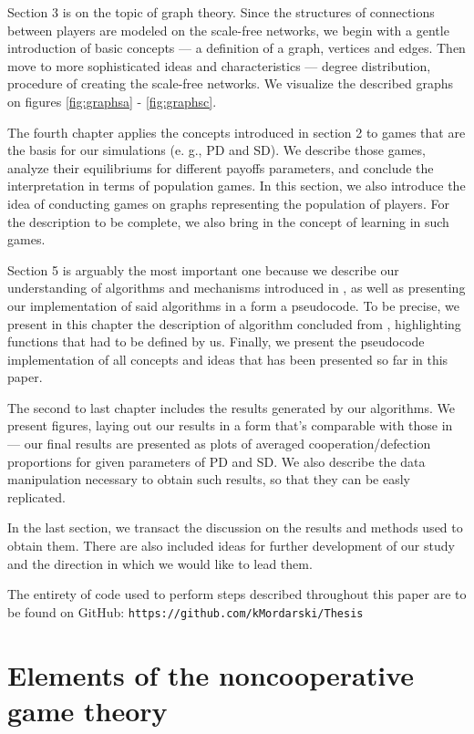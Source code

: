 \documentclass[english, twoside, 12pt, a4paper]{article}
\theoremstyle{definition}
\theoremstyle{plain}
\theoremstyle{remark}
\begin{document}
Section 3 is on the topic of graph theory. Since the structures of connections between players are modeled on the scale-free networks, we begin with a gentle introduction of basic concepts --- a definition of a graph, vertices and edges. Then move to more sophisticated ideas and characteristics --- degree distribution, procedure of creating the scale-free networks. We visualize the described graphs on figures \ref{fig:graphsa} - \ref{fig:graphsc}.

The fourth chapter applies the concepts introduced in section 2 to games that are the basis for our simulations (e. g., PD and SD). We describe those games, analyze their equilibriums for different payoffs parameters, and conclude the interpretation in terms of population games. In this section, we also introduce the idea of conducting games on graphs representing the population of players. For the description to be complete, we also bring in the concept of learning in such games.

Section 5 is arguably the most important one because we describe our understanding of algorithms and mechanisms introduced in \cite{santos2005scale}, as well as presenting our implementation of said algorithms in a form a pseudocode. To be precise, we present in this chapter the description of algorithm concluded from \cite{santos2005scale}, highlighting functions that had to be defined by us. Finally, we present the pseudocode implementation of all concepts and ideas that has been presented so far in this paper.

The second to last chapter includes the results generated by our algorithms. We present figures, laying out our results in a form that's comparable with those in \cite{santos2005scale} --- our final results are presented as plots of averaged cooperation/defection proportions for given parameters of PD and SD. We also describe the data manipulation necessary to obtain such results, so that they can be easly replicated. 

In the last section, we transact the discussion on the results and methods used to obtain them. There are also included ideas for further development of our study and the direction in which we would like to lead them. 

The entirety of code used to perform steps described throughout this paper are to be found on GitHub: \lstinline+https://github.com/kMordarski/Thesis+
\clearpage
\section{Elements of the noncooperative game theory}
\end{document}
